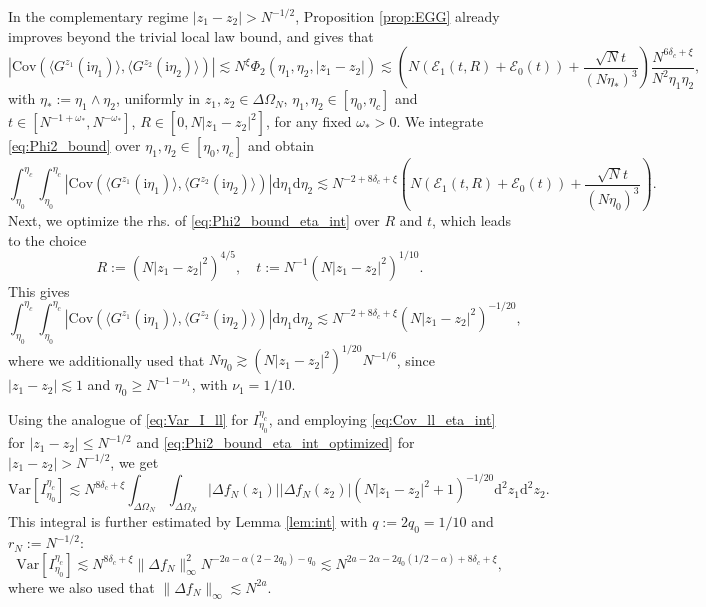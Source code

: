 \documentclass[10pt]{amsart}
\numberwithin{equation}{section}
\newcommand{\dif}{\mathrm{d}}
\newcommand{\Cov}{\mathrm{Cov}}
\newcommand{\Var}{\mathrm{Var}}
\newcommand{\ii}{\mathrm{i}}
\begin{document}
In the complementary regime $|z_1-z_2|>N^{-1/2}$, Proposition \ref{prop:EGG} already improves beyond the trivial local law bound, and gives that
\begin{equation}
\left\vert\Cov\left(\langle G^{z_1}(\ii\eta_1)\rangle,\langle G^{z_2}(\ii\eta_2)\rangle\right)\right\vert\lesssim N^\xi \Phi_2(\eta_1,\eta_2,|z_1-z_2|)\lesssim  \left(N(\mathcal{E}_1(t,R) + \mathcal{E}_0(t))+\frac{\sqrt{N}t}{(N\eta_*)^3}\right)\frac{N^{6\delta_c+\xi}}{N^2\eta_1\eta_2}, 
\label{eq:Phi2_bound}
\end{equation}
with $\eta_*:=\eta_1\wedge\eta_2$, uniformly in $z_1,z_2\in\Delta\Omega_N$, $\eta_1,\eta_2\in [\eta_0,\eta_c]$ and $t\in [N^{-1+\omega_*},N^{-\omega_*}]$, $R\in [0,N|z_1-z_2|^2]$, for any fixed $\omega_*>0$. We integrate \eqref{eq:Phi2_bound} over $\eta_1,\eta_2\in [\eta_0,\eta_c]$ and obtain
\begin{equation}
\int_{\eta_0}^{\eta_c}\int_{\eta_0}^{\eta_c}\left\vert\Cov\left(\langle G^{z_1}(\ii\eta_1)\rangle,\langle G^{z_2}(\ii\eta_2)\rangle\right)\right\vert\dif\eta_1\dif\eta_2\lesssim N^{-2+8\delta_c+\xi} \left(N(\mathcal{E}_1(t,R)+\mathcal{E}_0(t)) + \frac{\sqrt{N}t}{(N\eta_0)^3}\right).
\label{eq:Phi2_bound_eta_int}
\end{equation}
Next, we optimize the rhs. of \eqref{eq:Phi2_bound_eta_int} over $R$ and $t$, which leads to the choice
\begin{equation}
R:=\left(N|z_1-z_2|^2\right)^{4/5},\quad t:=N^{-1}\left(N|z_1-z_2|^2\right)^{1/10}.
\end{equation}
This gives
\begin{equation}
\int_{\eta_0}^{\eta_c}\int_{\eta_0}^{\eta_c}\left\vert\Cov\left(\langle G^{z_1}(\ii\eta_1)\rangle,\langle G^{z_2}(\ii\eta_2)\rangle\right)\right\vert\dif\eta_1\dif\eta_2\lesssim N^{-2+8\delta_c+\xi} \left(N|z_1-z_2|^2\right)^{-1/20},
\label{eq:Phi2_bound_eta_int_optimized}
\end{equation}
where we additionally used that $N\eta_0\gtrsim (N|z_1-z_2|^2)^{1/20}N^{-1/6}$, since $|z_1-z_2|\lesssim 1$ and $\eta_0\ge N^{-1-\nu_1}$, with $\nu_1=1/10$.

Using the analogue of \eqref{eq:Var_I_ll} for $I_{\eta_0}^{\eta_c}$, and employing \eqref{eq:Cov_ll_eta_int} for $|z_1-z_2|\le N^{-1/2}$ and \eqref{eq:Phi2_bound_eta_int_optimized} for $|z_1-z_2|>N^{-1/2}$, we get 
\begin{equation}
\Var\left[I_{\eta_0}^{\eta_c}\right] \lesssim N^{8\delta_c+\xi}\int_{\Delta \Omega_N}\int_{\Delta \Omega_N} |\Delta f_N(z_1)||\Delta f_N(z_2)| (N|z_1-z_2|^2 +1)^{-1/20}\dif^2 z_1\dif^2 z_2.
\label{eq:Var_I_optimized}
\end{equation}
This integral is further estimated by Lemma \ref{lem:int} with $q:=2q_0=1/10$ and $r_N:=N^{-1/2}$:
\begin{equation}
\Var\left[I_{\eta_0}^{\eta_c}\right] \lesssim N^{8\delta_c+\xi} \|\Delta f_N\|_\infty ^2 N^{-2a-\alpha(2-2q_0)-q_0}\lesssim N^{2a-2\alpha -2q_0(1/2-\alpha) +8\delta_c+\xi},
\label{eq:Var_interm_fin}
\end{equation}
where we also used that $\|\Delta f_N\|_\infty\lesssim N^{2a}$.
\end{document}
